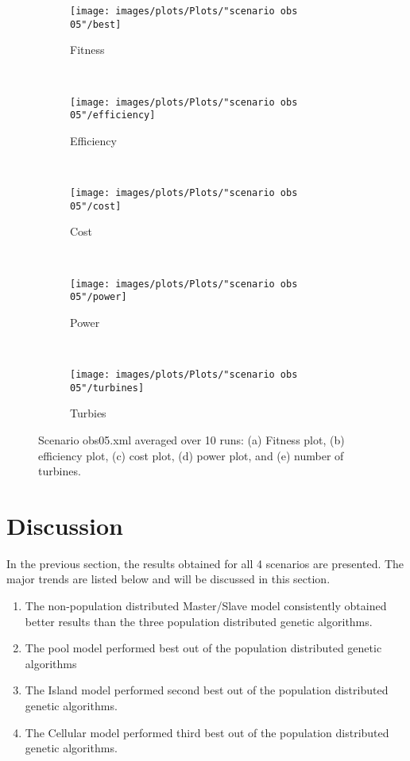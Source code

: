\begin{figure}[h!]
    \centering
      \begin{subfigure}[b]{0.45\textwidth}
        \texttt{[image: images/plots/Plots/"scenario obs 05"/best]}
        \caption{Fitness}
        \hfill
        \label{plot:fitness plot scenario obs 05}
    \end{subfigure}
    ~
      \begin{subfigure}[b]{0.45\textwidth}
        \texttt{[image: images/plots/Plots/"scenario obs 05"/efficiency]}
        \caption{Efficiency}
        \hfill
        \label{plot:efficiency plot scenario obs 05}
    \end{subfigure}
    ~
    \begin{subfigure}[b]{0.45\textwidth}
        \texttt{[image: images/plots/Plots/"scenario obs 05"/cost]}
        \caption{Cost}
        \hfill
        \label{plot:cost plot scenario obs 05}
    \end{subfigure}
    ~
    \begin{subfigure}[b]{0.45\textwidth}
        \texttt{[image: images/plots/Plots/"scenario obs 05"/power]}
        \caption{Power}
        \hfill
        \label{plot:power plot scenario obs 05}
    \end{subfigure}
    ~
    \begin{subfigure}[b]{0.45\textwidth}
        \texttt{[image: images/plots/Plots/"scenario obs 05"/turbines]}
        \caption{Turbies}
        \hfill
        \label{plot:turbines plot scenario obs 05}
    \end{subfigure}
    \caption{Scenario obs05.xml averaged over 10 runs: (a) Fitness plot, (b) efficiency plot, (c) cost plot, (d) power plot, and (e) number of turbines.}
    \label{plot:scenario obs 05}
\end{figure}


\section{Discussion}\label{section:discussion}
\noindent In the previous section, the results obtained for all 4 scenarios are presented. The major trends are listed below and will be discussed in this section.\\

\begin{enumerate}
\item The non-population distributed Master/Slave model consistently obtained better results than the three population distributed genetic algorithms.
\item The pool model performed best out of the population distributed genetic algorithms
\item The Island model performed second best out of the population distributed genetic algorithms. 
\item The Cellular model performed third best out of the population distributed genetic algorithms.
\end{enumerate}

